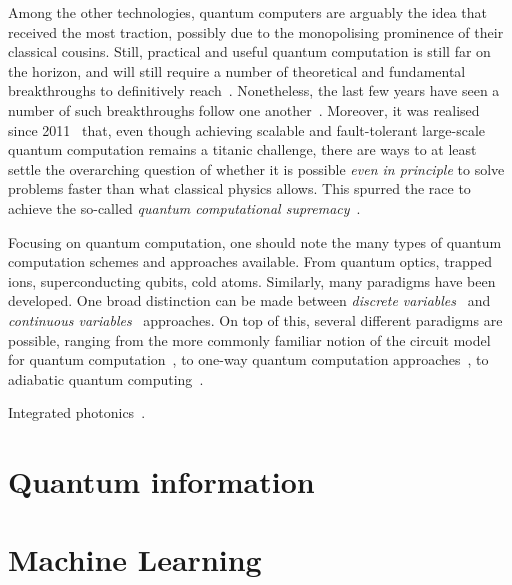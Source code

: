 Among the other technologies, quantum computers are arguably the idea that received the most traction, possibly due to the monopolising prominence of their classical cousins.
Still, practical and useful quantum computation is still far on the horizon, and will still require a number of theoretical and fundamental breakthroughs to definitively reach~\cite{preskill2018quantum,flamini2018photonic,wang2019integrated}.
Nonetheless, the last few years have seen a number of such breakthroughs follow one another~\cite{fowler2012surface,barends2014superconducting,córcoles2015demonstration,ofek2016extending,arute2019quantum}.
Moreover, it was realised since 2011~\cite{aaronson2011computational} that, even though achieving scalable and fault-tolerant large-scale quantum computation remains a titanic challenge, there are ways to at least settle the overarching question of whether it is possible \textit{even in principle} to solve problems faster than what classical physics allows. This spurred the race to achieve the so-called \textit{quantum computational supremacy}~\cite{preskill2012quantum,gross2013the,aaronson2011computational,bremner2016average,boixo2018characterizing,bouland2018complexity,aaronson2017complexity,neill2018blueprint,arute2019quantum}.

Focusing on quantum computation, one should note the many types of quantum computation schemes and approaches available. From quantum optics, trapped ions, superconducting qubits, cold atoms.
Similarly, many paradigms have been developed. One broad distinction can be made between \textit{discrete variables}~\cite{walmsley2005applied,andersen2015hybrid} and \textit{continuous variables}~\cite{lloyd1999quantum,braunstein2005quantum} approaches.
On top of this, several different paradigms are possible, ranging from the more commonly familiar notion of the circuit model for quantum computation~\cite{nielsen2006quantum}, to one-way quantum computation approaches~\cite{raussendorf2001one,walther2005experimental,browne2006one}, to adiabatic quantum computing~\cite{aharonov2004adiabatic,albash2018adiabatic}.

Integrated photonics~\cite{wang2019integrated,flamini2018photonic}.

\section{Quantum information}

\section{Machine Learning}

